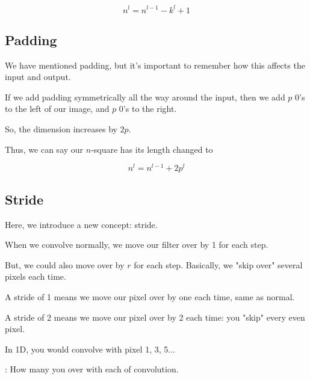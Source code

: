         \begin{equation*}
            n^{l} = n^{l-1}-k^{l}+1
        \end{equation*}
        
        
    
    \subsection{Padding}
        
        We have mentioned padding, but it's important to remember how this affects the input and output.
        
        If we add padding symmetrically all the way around the input, then we add $p$ 0's to the left of our image, and $p$ 0's to the right. 
        
        So, the dimension increases by $2p$.
        
        Thus, we can say our $n$-square has its length changed to 
        
        \begin{equation*}
            n^{l} = n^{l-1}+2p^l
        \end{equation*}
        
    \subsection{Stride}
    
        Here, we introduce a new concept: stride.
        
        When we convolve normally, we move our filter over by 1 for each step.
        
        But, we could also move over by $r$ for each step. Basically, we "skip over" several pixels each time. 
        
        A stride of 1 means we move our pixel over by one each time, same as normal.
        
        A stride of 2 means we move our pixel over by 2 each time: you "skip" every even pixel.
        
        In 1D, you would convolve with pixel 1, 3, 5...\\
        
        \begin{definition}
            : How many  you  over with each \purp of convolution.
        \end{definition}
        
